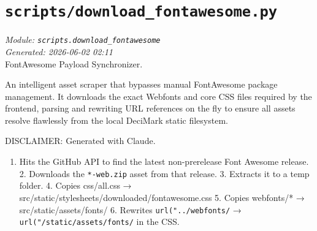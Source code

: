 
\section{\texttt{scripts/download\_fontawesome.py}}
\textit{Module: \texttt{scripts.download\_fontawesome}} \\
\textit{Generated: 2026-06-02 02:11} \\

FontAwesome Payload Synchronizer.

An intelligent asset scraper that bypasses manual FontAwesome package
management. It downloads the exact Webfonts and core CSS files required
by the frontend, parsing and rewriting URL references on the fly to
ensure all assets resolve flawlessly from the local DeciMark static
filesystem.

DISCLAIMER: Generated with Claude.

\begin{enumerate}
    \def\labelenumi{\arabic{enumi}.}
    \tightlist
  \item
    Hits the GitHub API to find the latest non-prerelease Font Awesome
    release. 2. Downloads the \texttt{*-web.zip} asset from that release.
    3. Extracts it to a temp folder. 4. Copies css/all.css →
    src/static/stylesheets/downloaded/fontawesome.css 5. Copies webfonts/*
    → src/static/assets/fonts/ 6. Rewrites \texttt{url("../webfonts/} →
      \texttt{url("/static/assets/fonts/} in the CSS.
    \end{enumerate}
